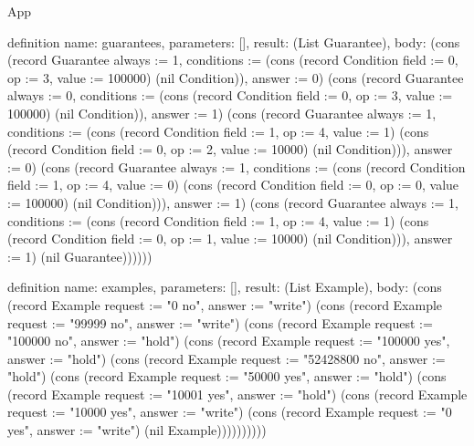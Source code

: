 \begin{lexlean}{App}
\begin{semanticmodule}
definition{
  name: guarantees,
  parameters: [],
  result: (List Guarantee),
  body: (cons (record Guarantee {always := 1, conditions := (cons (record Condition {field := 0, op := 3, value := 100000}) (nil Condition)), answer := 0}) (cons (record Guarantee {always := 0, conditions := (cons (record Condition {field := 0, op := 3, value := 100000}) (nil Condition)), answer := 1}) (cons (record Guarantee {always := 1, conditions := (cons (record Condition {field := 1, op := 4, value := 1}) (cons (record Condition {field := 0, op := 2, value := 10000}) (nil Condition))), answer := 0}) (cons (record Guarantee {always := 1, conditions := (cons (record Condition {field := 1, op := 4, value := 0}) (cons (record Condition {field := 0, op := 0, value := 100000}) (nil Condition))), answer := 1}) (cons (record Guarantee {always := 1, conditions := (cons (record Condition {field := 1, op := 4, value := 1}) (cons (record Condition {field := 0, op := 1, value := 10000}) (nil Condition))), answer := 1}) (nil Guarantee))))))
}

definition{
  name: examples,
  parameters: [],
  result: (List Example),
  body: (cons (record Example {request := "0 no", answer := "write"}) (cons (record Example {request := "99999 no", answer := "write"}) (cons (record Example {request := "100000 no", answer := "hold"}) (cons (record Example {request := "100000 yes", answer := "hold"}) (cons (record Example {request := "52428800 no", answer := "hold"}) (cons (record Example {request := "50000 yes", answer := "hold"}) (cons (record Example {request := "10001 yes", answer := "hold"}) (cons (record Example {request := "10000 yes", answer := "write"}) (cons (record Example {request := "0 yes", answer := "write"}) (nil Example))))))))))
}
\end{semanticmodule}
\end{lexlean}
